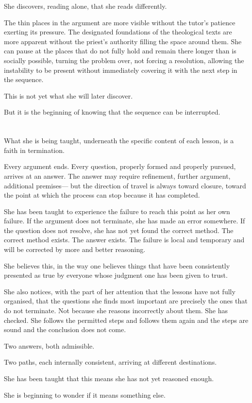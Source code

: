 She discovers, reading alone, that she reads differently.

The thin places in the argument are more visible without
the tutor's patience exerting its pressure. The designated
foundations of the theological texts are more apparent
without the priest's authority filling the space around
them. She can pause at the places that do not fully hold
and remain there longer than is socially possible, turning
the problem over, not forcing a resolution, allowing the
instability to be present without immediately covering it
with the next step in the sequence.

This is not yet what she will later discover.

But it is the beginning of knowing that the sequence can
be interrupted.

\section{}

What she is being taught, underneath the specific content
of each lesson, is a faith in termination.

Every argument ends. Every question, properly formed and
properly pursued, arrives at an answer. The answer may
require refinement, further argument, additional premises---
but the direction of travel is always toward closure,
toward the point at which the process can stop because
it has completed.

She has been taught to experience the failure to reach
this point as her own failure. If the argument does not
terminate, she has made an error somewhere. If the
question does not resolve, she has not yet found the
correct method. The correct method exists. The answer
exists. The failure is local and temporary and will be
corrected by more and better reasoning.

She believes this, in the way one believes things that
have been consistently presented as true by everyone
whose judgment one has been given to trust.

She also notices, with the part of her attention that
the lessons have not fully organised, that the questions
she finds most important are precisely the ones that do
not terminate. Not because she reasons incorrectly about
them. She has checked. She follows the permitted steps
and follows them again and the steps are sound and the
conclusion does not come.

Two answers, both admissible.

Two paths, each internally consistent, arriving at
different destinations.

She has been taught that this means she has not yet
reasoned enough.

She is beginning to wonder if it means something else.

